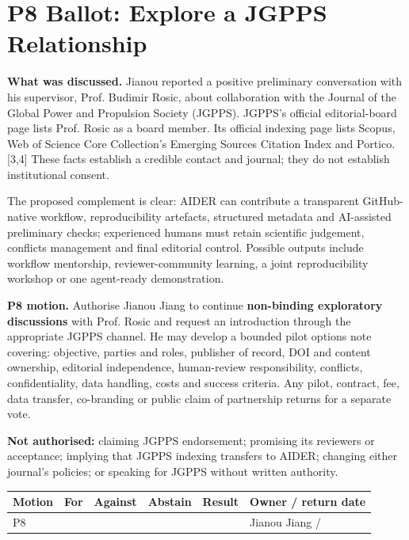 \documentclass[11pt]{article}
\newcommand{\src}[1]{{\footnotesize\color{ink3}[#1]}}
\begin{document}
\section{P8 Ballot: Explore a JGPPS Relationship}

\textbf{What was discussed.} Jianou reported a positive preliminary conversation with his supervisor, Prof. Budimir Rosic, about collaboration with the Journal of the Global Power and Propulsion Society (JGPPS). JGPPS's official editorial-board page lists Prof. Rosic as a board member. Its official indexing page lists Scopus, Web of Science Core Collection's Emerging Sources Citation Index and Portico. \src{3,4} These facts establish a credible contact and journal; they do not establish institutional consent.

The proposed complement is clear: AIDER can contribute a transparent GitHub-native workflow, reproducibility artefacts, structured metadata and AI-assisted preliminary checks; experienced humans must retain scientific judgement, conflicts management and final editorial control. Possible outputs include workflow mentorship, reviewer-community learning, a joint reproducibility workshop or one agent-ready demonstration.

\begin{solvebox}
\textbf{P8 motion.} Authorise Jianou Jiang to continue \textbf{non-binding exploratory discussions} with Prof. Rosic and request an introduction through the appropriate JGPPS channel. He may develop a bounded pilot options note covering: objective, parties and roles, publisher of record, DOI and content ownership, editorial independence, human-review responsibility, conflicts, confidentiality, data handling, costs and success criteria. Any pilot, contract, fee, data transfer, co-branding or public claim of partnership returns for a separate vote.
\end{solvebox}

\textbf{Not authorised:} claiming JGPPS endorsement; promising its reviewers or acceptance; implying that JGPPS indexing transfers to AIDER; changing either journal's policies; or speaking for JGPPS without written authority.

\begin{center}\small\sffamily
\begin{tabular}{@{}p{1.2cm}p{2cm}p{2cm}p{2cm}p{2cm}p{3.2cm}@{}}
\toprule
\textbf{Motion} & \textbf{For} & \textbf{Against} & \textbf{Abstain} & \textbf{Result} & \textbf{Owner / return date} \\
\midrule
P8 & & & & & Jianou Jiang / \\[9pt]
\bottomrule
\end{tabular}
\end{center}
\end{document}
